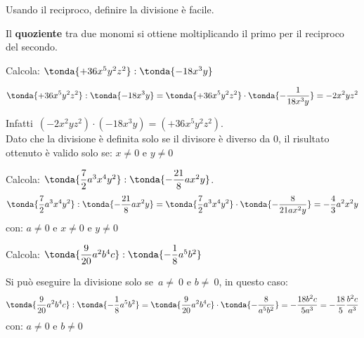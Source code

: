 Usando il reciproco, definire la divisione è facile.

\begin{definizione}{}{}
Il \textbf{quoziente} tra due
monomi si ottiene moltiplicando il primo per il reciproco del secondo.
\end{definizione}

\begin{esempio}{}{}
Calcola: \(\tonda{+36x^{5}y^{2}z^2}:\tonda{-18x^{3}y}\)

\vspace{-.5em}
\[\tonda{+36x^{5}y^{2}z^2}:\tonda{-18x^{3}y} =
\tonda{+36x^{5}y^{2}z^2} \cdot \tonda{-\frac{1}{18x^{3}y}} =-2x^{2}yz^2\]

\vspace{-.5em}
Infatti~\((-2x^{2}yz^2)\cdot(-18x^{3}y)=(+36x^{5}y^{2}z^2)\).\\
Dato che la divisione è definita solo se il divisore è diverso da 0, il 
risultato ottenuto è valido solo se:
\(x \neq 0 \text{ e } y\neq 0\)
\end{esempio}
% 
% 
% 
\begin{esempio}{}{}
Calcola: 
\(\tonda{\dfrac{7}{2}a^{3}x^{4}y^{2}}:\tonda{-\dfrac{21}{8}ax^{2}y}\).
\[\tonda{\frac{7}{2}a^{3}x^{4}y^{2}}:\tonda{-\frac{21}{8}ax^{2}y} =
  \tonda{\frac{7}{2}a^{3}x^{4}y^{2}}\cdot \tonda{-\frac{8}{21ax^{2}y}} =
  -\frac{4}{3}a^{2}x^{2}y\]
con: \(a \neq 0 \text{ e } x \neq 0 \text{ e } y\neq 0\)
\end{esempio}

\begin{esempio}{}{}
Calcola: 
\(\tonda{\dfrac{9}{20}a^{2}b^{4}c}:\tonda{-{\dfrac{1}{8}}a^{5}b^{2}}\)

Si può eseguire la divisione solo se~\(a\neq~0\text{ e }b\neq~0\), 
in questo caso:
\[\tonda{\frac{9}{20}a^{2}b^{4}c}:\tonda{-{\frac{1}{8}}a^{5}b^{2}} =
\tonda{\frac{9}{20}a^{2}b^{4}c} \cdot \tonda{-\frac{8}{a^{5}b^{2}}} =
-\frac{18b^2c}{5a^3} = -\frac{18}{5} \frac{b^2c}{a^3}\]
con: 
\(a \neq 0 \text{ e } b \neq 0\)
\end{esempio}

